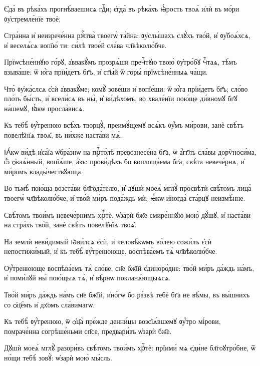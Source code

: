 \hKv Є҆да̀ въ рѣка́хъ прогнѣ́ваешисѧ гдⷭ҇и; є҆гда̀ въ  рѣка́хъ ꙗ҆́рость твоѧ̀ и҆лѝ въ мо́ри ᲂу҆стремле́нїе  твоѐ; 

\hKv Стра́нна и҆ неизрече́нна ржⷭ҇тва̀ твоегѡ̀ та́йна:  ᲂу҆слы́шахъ слꙋ́хъ тво́й, и҆ ᲂу҆боѧ́хсѧ, и҆ веселѧ́сѧ  вопїю́ ти: си́лѣ твое́й сла́ва чл҃вѣколю́бче. 
%

\hKv Прїѡсѣне́ннꙋю го́рꙋ, а҆ввакꙋ́мъ прозрѧ́ши пречⷭ҇тꙋю твою̀  ᲂу҆тро́бꙋ чⷭ҇таѧ, тѣ́мъ взыва́ше: ѿ ю҆́га прїи́детъ  бг҃ъ, и҆ ст҃ы́й ѿ горы̀ прїѡсѣне́нныѧ ча́щи. 

\hKv Что̀ ᲂу҆жа́слсѧ є҆сѝ а҆ввакꙋ́ме; комꙋ̀ зове́ши и҆  вопїе́ши: ѿ ю҆́га прїи́детъ бг҃ъ; сло́во пло́ть бы́сть, и҆  всели́сѧ въ ны̀, и҆ ви́дѣхомъ, во хвале́нїи пою́ще ди́вномꙋ  бг҃ꙋ на́шемꙋ, ꙗ҆́кѡ просла́висѧ.  
%

\hKv Къ тебѣ̀ ᲂу҆́тренюю всѣ́хъ творцꙋ̀, преимꙋ́щемꙋ всѧ́къ  ᲂу҆́мъ ми́рови, занѐ свѣ́тъ повелѣ̑нїѧ твоѧ̑, въ ни́хже  наста́ви мѧ̀. 
%

\hKv Ꙗ҆́кѡ ви́дѣ и҆са́їа ѡ҆бра́знѡ на прⷭ҇то́лѣ  превознесе́на бг҃а, ѿ а҆́гг҃лъ сла́вы дорѷноси́ма, ѽ  ѻ҆каѧ́нный, вопїѧ́ше, а҆́зъ: прови́дѣхъ бо воплоща́ема  бг҃а, свѣ́та невече́рнѧ, и҆ ми́ромъ влады́чествꙋюща. 

\hKv Во тьмѣ̀ пою́ща возста́ви бл҃года́телю, и҆ дꙋшѝ моеѧ̀  мглꙋ̀ просвѣтѝ свѣ́томъ лица̀ твоегѡ̀ чл҃вѣколю́бче, и҆  тво́й ми́ръ пода́ждь мѝ, ꙗ҆́кѡ и҆ногда̀ ста́рцꙋ  неизмѣ́нне. 
%

\hKv Свѣ́томъ твои́мъ невече́рнимъ хрⷭ҇тѐ, ѡ҆зарѝ бж҃е  смире́ннꙋю мою̀ дꙋ́шꙋ, и҆ наста́ви на стра́хъ тво́й, занѐ  свѣ́тъ повелѣ̑нїѧ твоѧ̑. 

\hKv На землѝ неви́димый ꙗ҆ви́лсѧ є҆сѝ, и҆ человѣ́кѡмъ  во́лею сожи́лъ є҆сѝ непостижи́мый,  и҆ къ тебѣ̀ ᲂу҆́тренююще, воспѣва́емъ тѧ̀  чл҃вѣколю́бче. 

\hKv Оу҆́тренююще воспѣва́емъ тѧ̀ сло́ве, сн҃е бж҃їй  є҆диноро́дне: тво́й ми́ръ да́ждь на́мъ, и҆ поми́лꙋй ны̀  пою́щыѧ тѧ̀, и҆ вѣ́рнѡ покланѧ́ющыѧсѧ. 

\hKv Тво́й ми́ръ да́ждь на́мъ сн҃е бж҃їй, и҆но́гѡ бо ра́звѣ  тебѐ бг҃а не вѣ́мы, въ вы́шнихъ со ѻ҆ц҃е́мъ и҆ дх҃омъ  сла́вимагѡ. 

\hKv Къ тебѣ̀ ᲂу҆́тренюю, ѿ ѻ҆ц҃а̀ пре́жде денни́цы  возсїѧ́вшемꙋ ᲂу҆́тро мі́рови, помраче́нна согрѣше́ньми  сп҃се, предвари́въ ѡ҆зарѝ бж҃е.  

\hKv Дꙋшѝ моеѧ̀ мглꙋ̀ разори́въ свѣ́томъ твои́мъ хрⷭ҇тѐ:  прїими́ мѧ є҆ди́не бл҃гоꙋтро́бне, ѿ но́щи тебѣ̀ зовꙋ̀:  ѡ҆зарѝ мою̀ мы́сль.  

